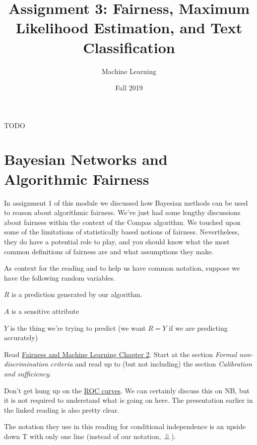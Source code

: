 \documentclass[assignment03_Solutions]{subfiles}
\title{Assignment 3: Fairness, Maximum Likelihood Estimation, and Text Classification}
\author{Machine Learning}
\date{Fall 2019}
\begin{document}
\maketitle
\thispagestyle{firstpage}


\begin{learningobjectives}
\bi
\item TODO
\ei
\end{learningobjectives}

\section{Bayesian Networks and Algorithmic Fairness}


In assignment 1 of this module we discussed how Bayesian methods can be used to reason about algorithmic fairness.  We've just had some lengthy discussions about fairness within the context of the Compas algorithm.  We touched upon some of the limitations of statistically based notions of fairness.  Nevertheless, they do have a potential role to play, and you should know what the most common definitions of fairness are and what assumptions they make.

As context for the reading and to help us have common notation, suppose we have the following random variables.

\bi
\item $R$ is a prediction generated by our algorithm.
\item $A$ is a sensitive attribute
\item $Y$ is the thing we're trying to predict (we want $R = Y$ if we are predicting accurately)
\ei

\begin{externalresources}[(30 minutes)]
Read \href{https://fairmlbook.org/classification.html}{Fairness and Machine Learning Chapter 2}.  Start at the section \emph{Formal non-discrimination criteria} and read up to (but not including) the section \emph{Calibration and sufficiency}.
\begin{notice}
\bi
\item Don't get hung up on the \href{https://en.wikipedia.org/wiki/Receiver_operating_characteristic}{ROC curves}.  We can certainly discuss this on NB, but it is not required to understand what is going on here.  The presentation earlier in the linked reading is also pretty clear.
\item The notation they use in this reading for conditional independence is an upside down T with only one line (instead of our notation, $\perp\!\!\!\perp$).
\ei
\end{notice}
\end{externalresources}
\end{document}
